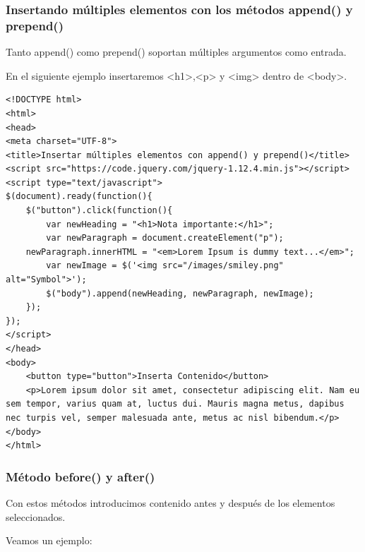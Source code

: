 \documentclass[11pt]{article}
\begin{document}
\subsubsection*{Insertando múltiples elementos con los métodos append() y prepend()}
\label{sec:org8bd7ed2}

Tanto append() como prepend() soportan múltiples argumentos como entrada. 

En el siguiente ejemplo insertaremos <h1>,<p> y <img> dentro de <body>.

\begin{verbatim}
<!DOCTYPE html>
<html>
<head>
<meta charset="UTF-8">
<title>Insertar múltiples elementos con append() y prepend()</title>
<script src="https://code.jquery.com/jquery-1.12.4.min.js"></script>
<script type="text/javascript">
$(document).ready(function(){
    $("button").click(function(){
        var newHeading = "<h1>Nota importante:</h1>";
        var newParagraph = document.createElement("p");
    newParagraph.innerHTML = "<em>Lorem Ipsum is dummy text...</em>";
        var newImage = $('<img src="/images/smiley.png" alt="Symbol">');
        $("body").append(newHeading, newParagraph, newImage);
    });
});
</script>
</head>
<body>
    <button type="button">Inserta Contenido</button>
    <p>Lorem ipsum dolor sit amet, consectetur adipiscing elit. Nam eu sem tempor, varius quam at, luctus dui. Mauris magna metus, dapibus nec turpis vel, semper malesuada ante, metus ac nisl bibendum.</p>
</body>
</html>                                		
\end{verbatim}

\subsubsection*{Método before() y after()}
\label{sec:org9f1b375}

Con estos métodos introducimos contenido antes y después de los elementos seleccionados.

Veamos un ejemplo:
\end{document}
